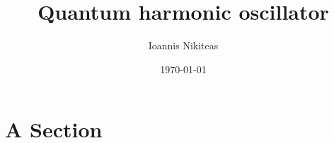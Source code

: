 \documentclass[12pt]{article}
\author{Ioannis Nikiteas}
\title{Quantum harmonic oscillator}
\date{\today}
\begin{document}
\maketitle	%

\section{A Section}
\lipsum[3]
\end{document}
